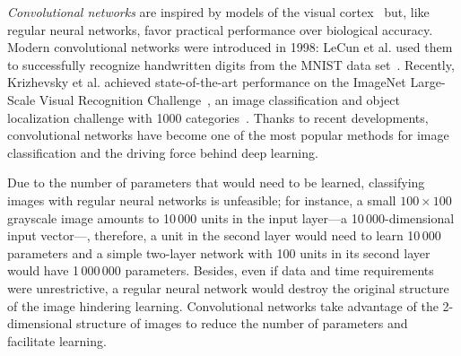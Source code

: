 \emph{Convolutional networks} are inspired by models of the visual cortex~\cite{Fukushima1980} but, like regular neural networks, favor practical performance over biological accuracy.
Modern convolutional networks were introduced in 1998: LeCun et al. used them to successfully recognize handwritten digits from the MNIST data set~\cite{LeCun1998}.
Recently, Krizhevsky et al. achieved state-of-the-art performance on the ImageNet Large-Scale Visual Recognition Challenge~\cite{Krizhevsky2012}, an image classification and object localization challenge with 1000 categories~\cite{Russakovsky2015}. Thanks to recent developments, convolutional networks have become one of the most popular methods for image classification and the driving force behind deep learning.



Due to the number of parameters that would need to be learned, classifying images with regular neural networks is unfeasible; for instance, a small $100\times100$ grayscale image amounts to 10\,000 units in the input layer---a 10\,000-dimensional input vector---, therefore, a unit in the second layer would need to learn 10\,000 parameters and a simple two-layer network with 100 units in its second layer would have 1\,000\,000 parameters. Besides, even if data and time requirements were unrestrictive, a regular neural network would destroy the original structure of the image hindering learning. Convolutional networks take advantage of the 2-dimensional structure of images to reduce the number of parameters and facilitate learning.

